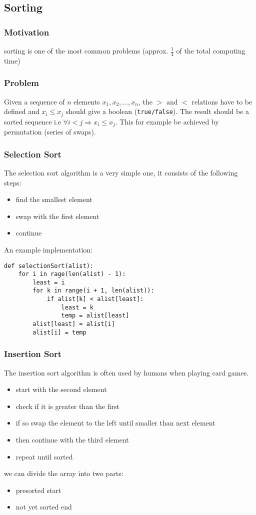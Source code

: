 \documentclass[a4paper]{article}
\begin{document}
\subsection{Sorting}
\subsubsection{Motivation}
sorting is one of the most common problems (approx. $ \frac{1}{4} $ of the total computing time)
\subsubsection{Problem}
Given a sequence of $ n $ elements $ x _{1}, x _{2} , \dots, x _{n} $, the $ > $ and $ < $ relations have to be defined and $ x _{i} \leq x _{j} $ should give a boolean (\texttt{true/false}).
The result should be a sorted sequence i.e $ \forall i < j \Rightarrow x_{i} \leq x _{j} $.
This for example be achieved by permutation (series of swaps).
\subsubsection{Selection Sort}
The selection sort algorithm is a very simple one, it consists of the following steps:
\begin{itemize}
    \item find the smallest element
    \item swap with the first element
    \item continue
\end{itemize}
An example implementation:

\begin{lstlisting}
def selectionSort(alist):
    for i in rage(len(alist) - 1):
        least = i
        for k in range(i + 1, len(alist)):
            if alist[k] < alist[least]:
                least = k 
                temp = alist[least]
        alist[least] = alist[i]
        alist[i] = temp
\end{lstlisting}

\subsubsection{Insertion Sort}
The insertion sort algorithm is often used by humans when playing card games.
\begin{itemize}
    \item start with the second element
    \item check if it is greater than the first
    \item if so swap the element to the left until smaller than next element
    \item then continue with the third element
    \item repeat until sorted
\end{itemize}
we can divide the array into two parts:
\begin{itemize}
    \item presorted start
    \item not yet sorted end
\end{itemize}
\end{document}
